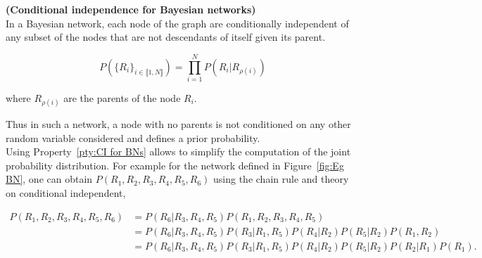 \documentclass[a4paper,11pt]{report}
\begin{document}
			\begin{prop} \textbf{(Conditional independence for Bayesian networks)}\\ 
				In a Bayesian network, each node of the graph are conditionally independent of any subset of the nodes that are not descendants of itself given its parent.
				
				\begin{equation}
				  P(\{R_{i}\}_{i \in \llbracket1,N \rrbracket}) = \prod_{i=1}^{N} P(R_{i} | R_{\rho(i)})
				  \label{eq:BN CI}
				\end{equation}
				
				where $R_{\rho(i)}$ are the parents of the node $R_{i}$. 
				\label{pty:CI for BNs}
			\end{prop}
			
			Thus in such a network, a node with no parents is not conditioned on any other random variable considered and defines a prior probability.\\

			Using Property~\ref{pty:CI for BNs} allows to simplify the computation of the joint probability distribution. For example for the network defined in Figure~\ref{fig:Eg BN}, one can obtain $P(R_{1},R_{2},R_{3},R_{4},R_{5},R_{6})$ using the chain rule and theory on conditional independent,
			
			\begin{equation*}
			  \begin{split}
			    P(R_{1},R_{2},R_{3},R_{4},R_{5},R_{6})
						&= P(R_{6} | R_{3},R_{4},R_{5}) P(R_{1},R_{2},R_{3},R_{4},R_{5}) \\
						&= P(R_{6} | R_{3},R_{4},R_{5}) P(R_{3} | R_{1},R_{5}) P(R_{4}| R_{2}) P(R_{5}| R_{2}) P(R_{1},R_{2})\\
						&= P(R_{6} | R_{3},R_{4},R_{5}) P(R_{3} | R_{1},R_{5}) P(R_{4}| R_{2}) P(R_{5}| R_{2}) P(R_{2}|R_{1}) P(R_{1}).\\
			  \end{split}
			  \label{eq:Eg BN CI}
			\end{equation*}
      
\end{document}
